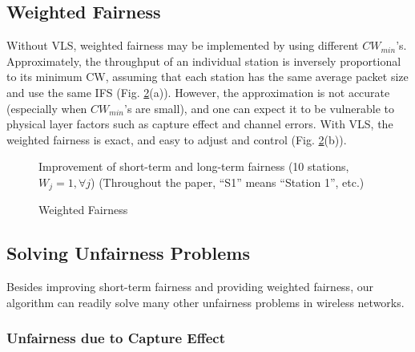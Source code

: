 \documentclass[letterpaper, 10 pt, conference]{ieeeconf}
\begin{document}
\subsection{Weighted Fairness}

Without VLS, weighted fairness may be implemented by using different
$CW_{min}$'s. Approximately, the throughput of an individual station is inversely
proportional to its minimum CW, assuming that each station has the same average packet
size and use the same IFS (Fig. \ref{fig:Weighted-Fairness}(a)). However, the approximation
is not accurate (especially when $CW_{min}$'s are small), and one can expect
it to be vulnerable to physical layer factors such as capture effect
and channel errors. With VLS, the weighted fairness is exact, and easy
to adjust and control (Fig. \ref{fig:Weighted-Fairness}(b)).

\begin{figure}


\caption{\label{fig:short-term}Improvement of short-term and long-term fairness
(10 stations, $W_{j}=1,\forall j$) (Throughout the paper, ``S1'' means ``Station 1'', etc.)}
\end{figure}


\begin{figure}


\caption{\label{fig:Weighted-Fairness}Weighted Fairness}
\end{figure}



\subsection{Solving Unfairness Problems}

Besides improving short-term fairness and providing weighted fairness,
our algorithm can readily solve many other unfairness problems in
wireless networks.


\subsubsection{Unfairness due to Capture Effect}
\end{document}
